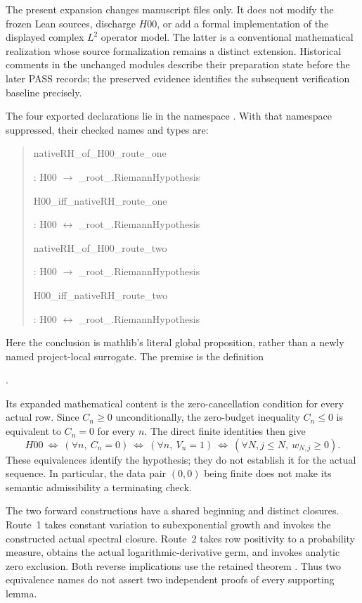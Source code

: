 The present expansion changes manuscript files only. It does not
modify the frozen Lean sources, discharge $H00$, or add a formal
implementation of the displayed complex $L^2$ operator model.
The latter is a conventional mathematical realization whose source
formalization remains a distinct extension. Historical comments in
the unchanged modules describe their preparation state before the
later PASS records; the preserved evidence identifies the subsequent
verification baseline precisely.

The four exported declarations lie in the namespace
. With that namespace suppressed,
their checked names and types are:
\begin{quote}\small\ttfamily
nativeRH\_of\_H00\_route\_one\par
\quad : H00 $\to$ \_root\_.RiemannHypothesis\par\medskip
H00\_iff\_nativeRH\_route\_one\par
\quad : H00 $\leftrightarrow$ \_root\_.RiemannHypothesis\par\medskip
nativeRH\_of\_H00\_route\_two\par
\quad : H00 $\to$ \_root\_.RiemannHypothesis\par\medskip
H00\_iff\_nativeRH\_route\_two\par
\quad : H00 $\leftrightarrow$ \_root\_.RiemannHypothesis
\end{quote}
Here the conclusion is mathlib's literal global proposition, rather
than a newly named project-local surrogate. The premise is the
definition
\begin{center}
 .
\end{center}
Its expanded mathematical content is the zero-cancellation condition
for every actual row. Since $C_n\ge0$ unconditionally, the zero-budget
inequality $C_n\le0$ is equivalent to $C_n=0$ for every $n$.
The direct finite identities then give
\[
 H00\ \Longleftrightarrow\ (\forall n,\ C_n=0)
 \ \Longleftrightarrow\ (\forall n,\ V_n=1)
 \ \Longleftrightarrow\ (\forall N,j\le N,\ w_{N,j}\ge0).
\]
These equivalences identify the hypothesis; they do not establish it
for the actual sequence. In particular, the data pair $(0,0)$ being
finite does not make its semantic admissibility a terminating check.

The two forward constructions have a shared beginning and distinct
closures. Route~1 takes constant variation to subexponential growth
and invokes the constructed actual spectral closure. Route~2 takes
row positivity to a probability measure, obtains the actual
logarithmic-derivative germ, and invokes analytic zero exclusion.
Both reverse implications use the retained theorem
. Thus two equivalence names do not assert two
independent proofs of every supporting lemma.


